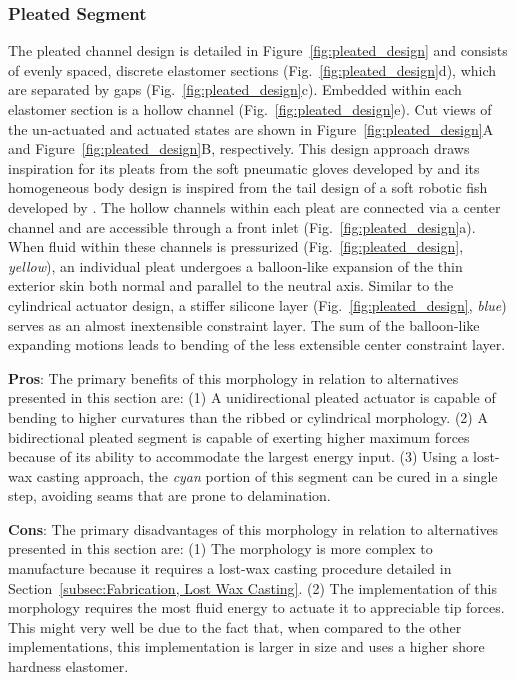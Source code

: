 \subsubsection{Pleated Segment}
\label{subsubsec:Actuators, Actuator Morphologies, Pleated}
The pleated channel design is detailed in Figure~\ref{fig:pleated_design} and consists of evenly spaced, discrete elastomer sections (Fig.~\ref{fig:pleated_design}d), which are separated by gaps (Fig.~\ref{fig:pleated_design}c).
%
Embedded within each elastomer section is a hollow channel (Fig.~\ref{fig:pleated_design}e).
%
Cut views of the un-actuated and actuated states are shown in Figure~\ref{fig:pleated_design}A and Figure~\ref{fig:pleated_design}B, respectively.
%
This design approach draws inspiration for its pleats from the soft pneumatic gloves developed by \citet{polygerinos2013towards} and its homogeneous body design is inspired from the tail design of a soft robotic fish developed by \citet{katzschmann2014hydraulic}.
%
The hollow channels within each pleat are connected via a center channel and are accessible through a front inlet (Fig.~\ref{fig:pleated_design}a).
%
When fluid within these channels is pressurized (Fig.~\ref{fig:pleated_design}, \emph{yellow}), an individual pleat undergoes a balloon-like expansion of the thin exterior skin both normal and parallel to the neutral axis.
%
Similar to the cylindrical actuator design, a stiffer silicone layer (Fig.~\ref{fig:pleated_design}, \emph{blue}) serves as an almost inextensible constraint layer.
%
The sum of the balloon-like expanding motions leads to bending of the less extensible center constraint layer.

\textbf{Pros}: The primary benefits of this morphology in relation to alternatives presented in this section are: (1) A unidirectional pleated actuator is capable of bending to higher curvatures than the ribbed or cylindrical morphology.
(2) A bidirectional pleated segment is capable of exerting higher maximum forces because of its ability to accommodate the largest energy input.
(3) Using a lost-wax casting approach, the \emph{cyan} portion of this segment can be cured in a single step, avoiding seams that are prone to delamination.

\textbf{Cons}: The primary disadvantages of this morphology in relation to alternatives presented in this section are: (1) The morphology is more complex to manufacture because it requires a lost-wax casting procedure detailed in Section~\ref{subsec:Fabrication, Lost Wax Casting}. (2) The implementation of this morphology requires the most fluid energy to actuate it to appreciable tip forces. This might very well be due to the fact that, when compared to the other implementations, this implementation is larger in size and uses a higher shore hardness elastomer.

